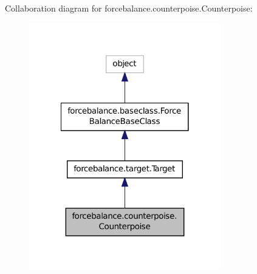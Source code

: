 Collaboration diagram for forcebalance.\-counterpoise.\-Counterpoise\-:
\nopagebreak
\begin{figure}[H]
\begin{center}
\leavevmode
\includegraphics[width=236pt]{classforcebalance_1_1counterpoise_1_1Counterpoise__coll__graph}
\end{center}
\end{figure}
